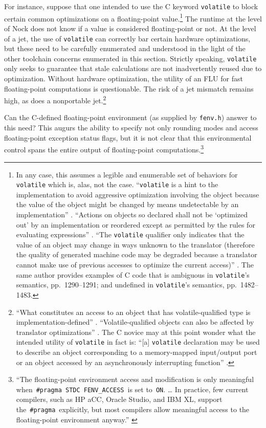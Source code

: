\documentclass[twoside]{article}
\begin{document}
For instance, suppose that one intended to use the C keyword \texttt{volatile} to block certain common optimizations on a floating-point value.\footnote{In any case, this assumes a legible and enumerable set of behaviors for \texttt{volatile} which is, alas, not the case.  “\texttt{volatile} is a hint to the implementation to avoid aggressive optimization involving the object because the value of the object might be changed by means undetectable by an implementation” \citep[p.~472]{Jones2008}.  “Actions on objects so declared shall not be ‘optimized out’ by an implementation or reordered except as permitted by the rules for evaluating expressions” \citep[p.~1500]{Jones2008}.  “The \texttt{volatile} qualifier only indicates that the value of an object may change in ways unknown to the translator (therefore the quality of generated machine code may be degraded because a translator cannot make use of previous accesses to optimize the current access)” \citep[p.~963]{Jones2008}.  The same author provides examples of C code that is ambiguous in \texttt{volatile}'s semantics, pp.~1290–1291; and undefined in \texttt{volatile}'s semantics, pp.~1482–1483.}  The runtime at the level of Nock does not know if a value is considered floating-point or not.  At the level of a jet, the use of \texttt{volatile} can correctly bar certain hardware optimizations, but these need to be carefully enumerated and understood in the light of the other toolchain concerns enumerated in this section.  Strictly speaking, \texttt{volatile} only seeks to guarantee that stale calculations are not inadvertently reused due to optimization.  Without hardware optimization, the utility of an FLU for fast floating-point computations is questionable.  The risk of a jet mismatch remains high, as does a nonportable jet.\footnote{“What constitutes an access to an object that has volatile-qualified type is implementation-defined” \citep[p.~1488]{Jones2008}.  “Volatile-qualified objects can also be affected by translator optimizations” \citep[p.~1490]{Jones2008}.  The C novice may at this point wonder what the intended utility of \texttt{volatile} in fact is:  “[a] \texttt{volatile} declaration may be used to describe an object corresponding to a memory-mapped input/output port or an object accessed by an asynchronously interrupting function” \citep[p.~1499]{Jones2008}.}

Can the C-defined floating-point environment (as supplied by \texttt{fenv.h}) answer to this need?  This augurs the ability to specify not only rounding modes and access floating-point exception status flags, but it is not clear that this environmental control spans the entire output of floating-point computations.\footnote{“The floating-point environment access and modification is only meaningful when \texttt{#pragma STDC FENV_ACCESS} is set to \texttt{ON}.  \ldots{} In practice, few current compilers, such as HP aCC, Oracle Studio, and IBM XL, support the \texttt{#pragma} explicitly, but most compilers allow meaningful access to the floating-point environment anyway.” \citep{CPPRef}}
\end{document}

